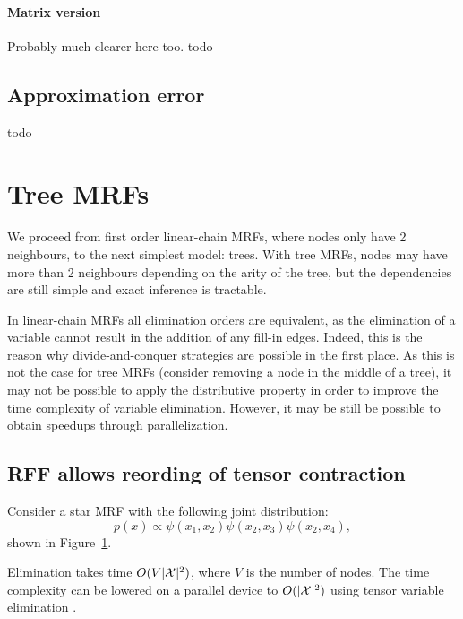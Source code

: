 \documentclass{article}
\begin{document}
\paragraph{Matrix version}
Probably much clearer here too.
todo

\subsection{Approximation error}
todo

\section{Tree MRFs}
We proceed from first order linear-chain MRFs, where nodes only have 2 neighbours,
to the next simplest model: trees.
With tree MRFs, nodes may have more than 2 neighbours depending on the arity of the tree,
but the dependencies are still simple and exact inference is tractable.

In linear-chain MRFs all elimination orders are equivalent, as the elimination 
of a variable cannot result in the addition of any fill-in edges.
Indeed, this is the reason why divide-and-conquer strategies are possible
in the first place.
As this is not the case for tree MRFs (consider removing a node in the middle of a tree),
it may not be possible to apply the distributive property in order to
improve the time complexity of variable elimination.
However, it may be still be possible to obtain speedups through parallelization. 

\subsection{RFF allows reording of tensor contraction}
Consider a star MRF with the following joint distribution:
\begin{equation}
p(x) \propto \psi(x_1, x_2) \psi(x_2, x_3) \psi(x_2, x_4),
\end{equation}
shown in Figure~\ref{fig:star-mrf}.
\begin{figure}[htb!]
\centering
{}
\caption{
\label{fig:star-mrf}
}
\end{figure}
Elimination takes time $O(V|\mathcal{X}|^2)$, where $V$ is the number of nodes.
The time complexity can be lowered on a parallel device to $O(|\mathcal{X}|^2)$
using tensor variable elimination \citep{obermeyer2019tve}.
\end{document}
